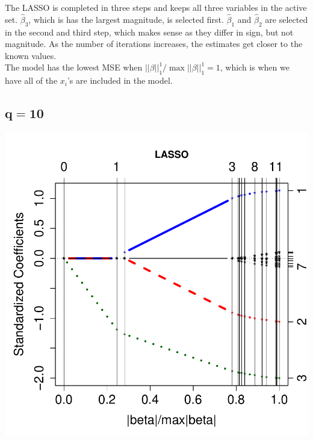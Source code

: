\documentclass[a4paper]{article}
\begin{document}
The LASSO is completed in three steps and keeps all three variables in the active set.
$\hat{\beta}_3$, which is has the largest magnitude, is selected first.  $\hat{\beta}_1$ and
$\hat{\beta}_2$ are selected in the second and third step, which makes sense as they differ
in sign, but not magnitude.  As the number of iterations increases, the estimates
get closer to the known values.\\

The model has the lowest MSE when $||\beta||^1_1/\max ||\beta||^1_1=1$,
which is when we have all of the $x_i$'s are included in the model.

\subsection{$\mathbf{q=10}$}
\vspace{-15pt}
\begin{minipage}[c]{0.6\linewidth}
\includegraphics{h4_ind-005}
\end{minipage}
\hspace{-50pt}
\end{document}
